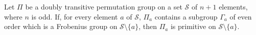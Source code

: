 Let $\Pi$ be a doubly transitive permutation group on a set $\mathcal{S}$ of $n+1$ elements, where $n$ is odd. If, for every element $a$ of $\mathcal{S}$, $\Pi_a$ contains a subgroup $\Gamma_a$ of even order which is a Frobenius group on $\mathcal{S} \setminus \{a\}$, then $\Pi_a$ is primitive on $\mathcal{S} \setminus \{a\}$.
